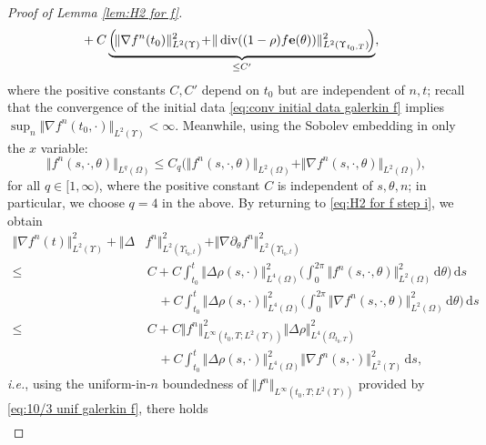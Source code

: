 \documentclass[11pt,a4paper,reqno]{amsart}
\theoremstyle{remark}
\theoremstyle{definition}
\numberwithin{equation}{section}
\DeclareMathOperator{\dv}{div}
\newcommand{\e}{{\bf e}}
\renewcommand{\d}{\, \mathrm{d} }
\begin{document}
\begin{proof}[Proof of Lemma \ref{lem:H2 for f}]
\begin{equation}
\begin{aligned}
         &+ C\underbrace{\Big(\! \Vert\nabla f^n(t_0)\Vert_{L^2(\Upsilon)}^2 \!+\! \Vert \dv((1-\rho)f \e(\theta)) \Vert^2_{L^2(\Upsilon_{t_0,T})} \!\Big)}_{\leq C'}, 
     \end{aligned}
 \end{equation} 
 where the positive constants $C,C'$ depend on $t_0$ but are independent of $n,t$; recall that the convergence of the initial data \eqref{eq:conv initial data galerkin f} implies $\sup_n \Vert \nabla f^n(t_0,\cdot) \Vert_{L^2(\Upsilon)}<\infty$. Meanwhile, using the Sobolev embedding in only the $x$ variable: 
 \begin{equation*}
     \Vert f^n(s,\cdot,\theta) \Vert_{L^q(\Omega)} \leq C_q \Big( \Vert f^n(s,\cdot,\theta) \Vert_{L^2(\Omega)} + \Vert \nabla f^n(s,\cdot,\theta) \Vert_{L^2(\Omega)} \Big), 
 \end{equation*}
 for all $q \in [1,\infty)$, where the positive constant $C$ is independent of $s,\theta,n$; in particular, we choose $q=4$ in the above. By returning to \eqref{eq:H2 for f step i}, we obtain 
 \begin{equation*}
     \begin{aligned}
        \Vert\nabla f^n(t) \Vert_{L^2(\Upsilon)}^2 +\! \Vert\Delta & f^n\Vert_{L^2(\Upsilon_{t_0,t})}^2 + \Vert\nabla \partial_\theta f^n \Vert_{L^2(\Upsilon_{t_0,t})}^2 \\ 
        \leq & \, C + C \int_{t_0}^t \Vert \Delta \rho(s,\cdot) \Vert_{L^4(\Omega)}^2 \bigg( \int_0^{2\pi} \Vert f^n(s,\cdot,\theta) \Vert_{L^2(\Omega)}^2  \d\theta \bigg) \d s \\ 
        &\, \, \, \, \, \,  +  C \int_{t_0}^t \Vert \Delta \rho(s,\cdot) \Vert_{L^4(\Omega)}^2 \bigg( \int_0^{2\pi} \Vert \nabla f^n(s,\cdot,\theta) \Vert_{L^2(\Omega)}^2 \d\theta \bigg) \d s \\ 
        \leq & \, C + C \Vert f^n \Vert_{L^\infty(t_0,T;L^2(\Upsilon))}^2 \Vert \Delta \rho \Vert_{L^4(\Omega_{t_0,T})}^2 \\ 
        & \, \, \, \, \, \, + C \int_{t_0}^t  \Vert \Delta \rho(s,\cdot) \Vert_{L^4(\Omega)}^2 \Vert \nabla f^n(s,\cdot) \Vert_{L^2(\Upsilon)}^2 \d s, 
     \end{aligned}
 \end{equation*} 
 \textit{i.e.}, using the uniform-in-$n$ boundedness of $\Vert f^n \Vert_{L^\infty(t_0,T;L^2(\Upsilon))}$ provided by \eqref{eq:10/3 unif galerkin f}, there holds 
  \begin{equation}\label{eq:H2 for f step ii}
     \begin{aligned}

\end{aligned}
\end{equation}
\end{proof}
\end{document}

